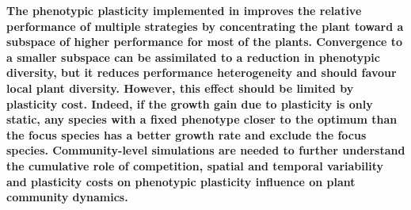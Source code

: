 \begin{figure}\label{fig:variable_pl_effect}
    \classiccaptionstyle
{}
\end{figure}


\textbf{The phenotypic plasticity implemented in \model improves the relative performance of multiple strategies by concentrating the plant toward a subspace of higher performance for most of the plants. Convergence to a smaller subspace can be assimilated to a reduction in phenotypic diversity, but it reduces performance heterogeneity and should favour local plant diversity. However, this effect should be limited by plasticity cost. Indeed, if the growth gain due to plasticity is only static, any species with a fixed phenotype closer to the optimum than the focus species has a better growth rate and exclude the focus species.
 Community-level simulations are needed to further understand the cumulative role of competition, spatial and temporal variability and plasticity costs on phenotypic plasticity influence on plant community dynamics.}


